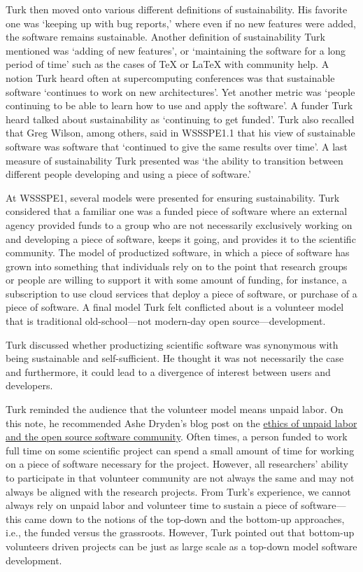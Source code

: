 \documentclass[11pt, oneside]{amsart}
\begin{document}
Turk then moved onto various different definitions of sustainability. His
favorite one was `keeping up with bug reports,' where even if no new features
were added, the software remains sustainable. Another definition of
sustainability Turk mentioned was `adding of new features', or `maintaining the
software for a long period of time' such as the cases of TeX or LaTeX with
community help. A notion Turk heard often at supercomputing conferences was that
sustainable software `continues to work on new architectures'. Yet another
metric was `people continuing to be able to learn how to use and apply the
software'. A funder Turk heard talked about sustainability as `continuing to get
funded'. Turk also recalled that Greg Wilson, among others, said in WSSSPE1.1
that his view of sustainable software was software that `continued to give the
same results over time'. A last measure of sustainability Turk presented was
`the ability to transition between different people developing and using a piece
of software.'

At WSSSPE1, several models were presented for ensuring sustainability. Turk
considered that a familiar one was a funded piece of software where an external
agency provided funds to a group who are not necessarily exclusively working on
and developing a piece of software, keeps it going, and provides it to the
scientific community. The model of productized software, in which a piece of
software has grown into something that individuals rely on to the point that
research groups or people are willing to support it with some amount of funding,
for instance, a subscription to use cloud services that deploy a piece of
software, or purchase of a piece of software. A final model Turk felt conflicted
about is a volunteer model that is traditional old-school---not modern-day open
source---development.

Turk discussed whether productizing scientific software was synonymous with
being sustainable and self-sufficient. He thought it was not necessarily the
case and furthermore, it could lead to a divergence of interest between users
and developers.

Turk reminded the audience that the volunteer model means unpaid labor. On this
note, he recommended Ashe Dryden's blog post on the
\href{http://www.ashedryden.com/blog/the-ethics-of-unpaid-labor-and-the-oss-community}{ethics
of unpaid labor and the open source software community}. Often times, a person
funded to work full time on some scientific project can spend a small amount of
time for working on a piece of software necessary for the project. However, all
researchers' ability to participate in that volunteer community are not always
the same and may not always be aligned with the research projects. From Turk's
experience, we cannot always rely on unpaid labor and volunteer time to sustain
a piece of software---this came down to the notions of the top-down and the
bottom-up approaches, i.e., the funded versus the grassroots. However, Turk
pointed out that bottom-up volunteers driven projects can be just as large scale
as a top-down model software development.
\end{document}
